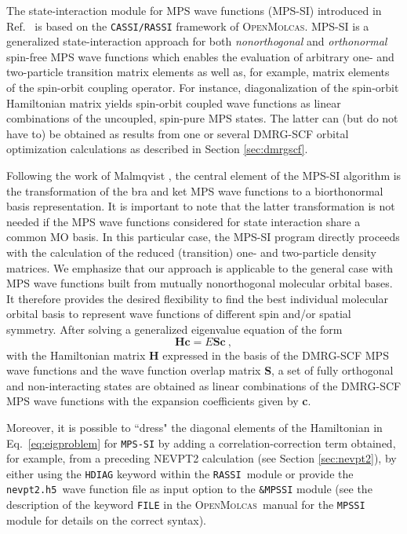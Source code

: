 \documentclass[bibliography=totoc,12pt,a4paper]{scrartcl}
\newcommand{\mol}{\textsc{OpenMolcas}}
\newcommand{\hostp}{\mol}
\newcommand{\kwd}[1]{\texttt{#1}}
\begin{document}
The state-interaction module for MPS wave functions (MPS-SI) introduced in
Ref.~\cite{knec16b} is based on the \texttt{CASSI/RASSI} framework \cite{malm89,malm02} of \hostp.
MPS-SI is a generalized state-interaction approach for
both \textit{nonorthogonal} and \textit{orthonormal} spin-free MPS wave
functions which enables the evaluation of arbitrary one- and
two-particle transition matrix elements as well as, for example, matrix
elements of the spin-orbit coupling operator.
For instance, diagonalization of the spin-orbit Hamiltonian matrix
yields spin-orbit coupled wave functions as linear combinations of the
uncoupled, spin-pure MPS states. The latter can (but do not have to)
be obtained as results from one or several DMRG-SCF orbital
optimization calculations as described in Section \ref{sec:dmrgscf}.

Following the work of Malmqvist \cite{malm86}, the central element of the MPS-SI
algorithm is the transformation of the bra and ket MPS wave functions
to a biorthonormal basis representation.
It is important to note that the latter transformation is not needed
if the MPS wave functions considered for state interaction
share a common MO basis. In this particular case, the MPS-SI program directly
proceeds with the calculation of the reduced (transition) one- and two-particle
density matrices.
We emphasize that our approach is applicable to the general case with MPS
wave functions built from mutually nonorthogonal molecular orbital bases.
It therefore provides the desired flexibility
to find the best individual molecular orbital basis to represent
wave functions of different spin and/or spatial symmetry.
After solving a generalized eigenvalue
equation of the form
\begin{equation}\label{eq:eigproblem}
{\textbf{Hc}} = E {\textbf{Sc}}\ ,
\end{equation}
with the Hamiltonian matrix \textbf{H} expressed in the basis of the DMRG-SCF MPS
wave functions and the wave function overlap matrix \textbf{S},
a set of fully orthogonal and non-interacting states are obtained
as linear combinations of the DMRG-SCF MPS wave functions with
the expansion coefficients given by \textbf{c}.

Moreover, it is possible to ``dress" the diagonal elements of the Hamiltonian in Eq.~\eqref{eq:eigproblem} for \kwd{MPS-SI} by adding
a correlation-correction term obtained, for example, from a preceding NEVPT2
calculation (see Section \ref{sec:nevpt2}), by either using the \texttt{HDIAG} keyword within the \kwd{RASSI}\ module or provide the \texttt{nevpt2.h5}\ wave function file as input option to the \kwd{\&MPSSI} module (see the description of the keyword \kwd{FILE} in the \hostp\ manual for the \kwd{MPSSI} module for details on the correct syntax).
\end{document}

